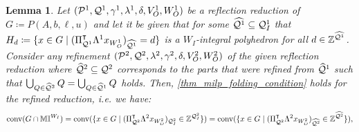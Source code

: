 \documentclass[pdflatex,sn-mathphys-num]{sn-jnl}%
\theoremstyle{thmstyleone}%
\newtheorem{lemma}[lemma]{Lemma}
\theoremstyle{thmstylethree}%
\theoremstyle{thmstyletwo}%
\newcommand{\conv}{\mathrm{conv}}
\begin{document}
\begin{lemma}
    \label{thm_refinement_integrality_okay}
    Let $(\mathcal{P}^1,\mathcal{Q}^1,\gamma^1,\lambda^1,\delta,V^1_O,W^1_O)$ be a reflection reduction of $G\coloneqq P(A,b,\ell,u)$ and let it be given that for some $\widehat{\mathcal{Q}^1} \subseteq \mathcal{Q}^1_I$ that 
    $H_d \coloneqq \{ x \in G \mid (\transpose{\Pi_{\MQ^1}} \Lambda^1 x_{W^1_O})_{\widehat{\MQ^1}} = d \}$ is a ${W_I}$-integral polyhedron for all $d\in \mathbb{Z}^{\widehat{\mathcal{Q}^1}}$.
    Consider any refinement $(\mathcal{P}^2,\mathcal{Q}^2, \lambda^2, \gamma^2,\delta,V^2_O,W^2_O)$ of the given reflection reduction where $\widehat{\mathcal{Q}}^2 \subseteq \mathcal{Q}^2$ corresponds to the parts that were refined from $\widehat{\mathcal{Q}}^1$ such that $\bigcup_{Q\in \widehat{\mathcal{Q}}^2} Q = \bigcup_{Q\in \widehat{\mathcal{Q}}^1} Q$ holds. Then, \eqref{thm_milp_folding_condition} holds for the refined reduction, i.e. we have:
    \begin{equation*}
        \conv(G\cap \M^{W_I}) = \conv(\{x \in G \mid (\transpose{\Pi_{\MQ^2}} \Lambda^2 x_{W^2_O})_{{\MQ^2_I}} \in \Z^{{\MQ^2_I}}\}) = \conv(\{x \in G \mid (\transpose{\Pi_{\MQ^2}} \Lambda^2 x_{W^2_O})_{\widehat{\MQ^2}} \in \Z^{\widehat{\MQ^2}}\}),
    \end{equation*}
\end{lemma}
\end{document}
